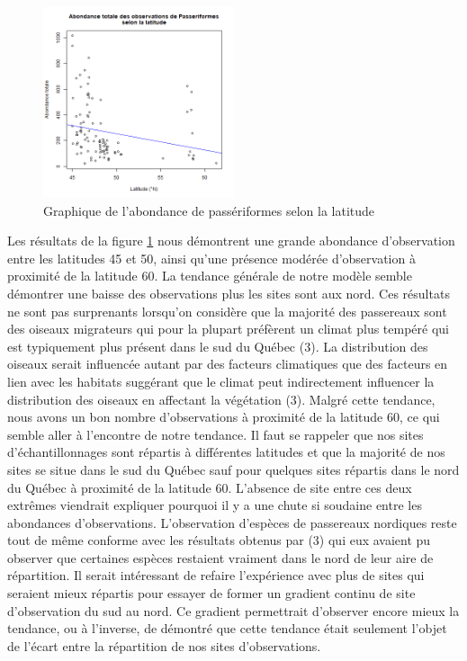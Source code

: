 \documentclass[9pt,twocolumn,twoside,]{pnas-new}
\begin{document}
\begin{figure}
\centering
\includegraphics[width=0.5\textwidth,height=0.4\textheight]{Figure3.png}
\caption{Graphique de l'abondance de passériformes selon la latitude
\label{fig:plot2}}
\end{figure}

Les résultats de la figure \ref{fig:plot2} nous démontrent une grande
abondance d'observation entre les latitudes 45 et 50, ainsi qu'une
présence modérée d'observation à proximité de la latitude 60. La
tendance générale de notre modèle semble démontrer une baisse des
observations plus les sites sont aux nord. Ces résultats ne sont pas
surprenants lorsqu'on considère que la majorité des passereaux sont des
oiseaux migrateurs qui pour la plupart préfèrent un climat plus tempéré
qui est typiquement plus présent dans le sud du Québec (3). La
distribution des oiseaux serait influencée autant par des facteurs
climatiques que des facteurs en lien avec les habitats suggérant que le
climat peut indirectement influencer la distribution des oiseaux en
affectant la végétation (3). Malgré cette tendance, nous avons un bon
nombre d'observations à proximité de la latitude 60, ce qui semble aller
à l'encontre de notre tendance. Il faut se rappeler que nos sites
d'échantillonnages sont répartis à différentes latitudes et que la
majorité de nos sites se situe dans le sud du Québec sauf pour quelques
sites répartis dans le nord du Québec à proximité de la latitude 60.
L'absence de site entre ces deux extrêmes viendrait expliquer pourquoi
il y a une chute si soudaine entre les abondances d'observations.
L'observation d'espèces de passereaux nordiques reste tout de même
conforme avec les résultats obtenus par (3) qui eux avaient pu observer
que certaines espèces restaient vraiment dans le nord de leur aire de
répartition. Il serait intéressant de refaire l'expérience avec plus de
sites qui seraient mieux répartis pour essayer de former un gradient
continu de site d'observation du sud au nord. Ce gradient permettrait
d'observer encore mieux la tendance, ou à l'inverse, de démontré que
cette tendance était seulement l'objet de l'écart entre la répartition
de nos sites d'observations.
\end{document}
